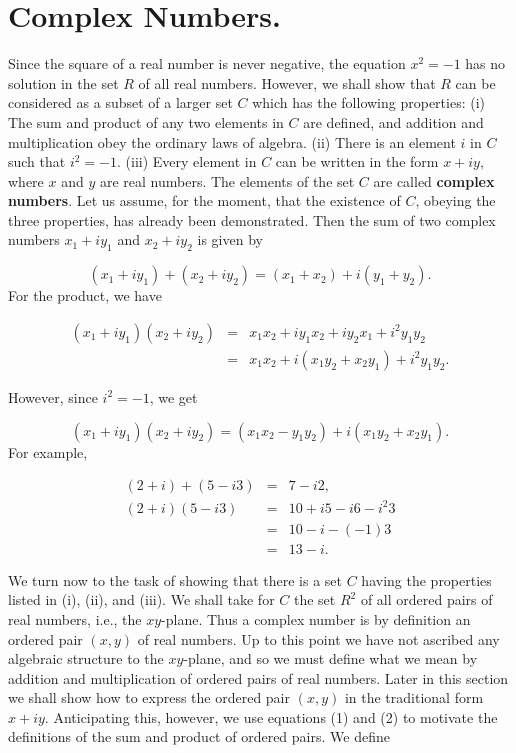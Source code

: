 \section{Complex Numbers.} 
Since the square of a real number is never negative, the equation $x^2 = -1$ has no solution in the set $R$ of all real numbers. However, we shall show that $R$ can be considered as a subset of a larger set $C$ which has the following properties: 
(i) The sum and product of any two elements in $C$ are defined, and addition and multiplication obey the ordinary laws of algebra. (ii) There is an element $i$ in $C$ such that $i^2 = - 1$. (iii) Every element in $C$ can be written in the form $x + iy$, where $x$ and $y$ are real numbers. The elements of the set $C$ are called \textbf{complex numbers}. Let us assume, for the moment, that the existence of $C$, obeying the three properties, has already been demonstrated. Then the sum of two complex numbers $x_{1} + iy_1$ and $x_{2} + iy_2$ is given by


\begin{equation}
(x_{1} + iy_{1}) + (x_{2} + iy_{2}) = (x_{1} + x_{2}) + i(y_{1} + y_{2}).  
\label{eq6.6.1}
\end{equation}
\noindent For the product, we have
 
\begin{eqnarray*}
(x_{1} + iy_{1})(x_{2} + iy_{2}) &=& x_{1}x_{2} + iy_{1}x_{2} + iy_{2}x_{1} + i^{2}y_{1}y_{2} \\
                                                &=& x_{1}x_{2} + i(x_{1}y_{2} + x_{2}y_{1}) + i^{2}y_{1}y_{2}.
\end{eqnarray*}

\noindent However, since $i^2 = -1$, we get

\begin{equation}
(x_{1} + iy_{1})(x_{2} + iy_{2}) = (x_{1}x_{2} - y_{1}y_{2}) +  i(x_{1}y_{2} + x_{2}y_{1}).  
\label{eq6.6.2}
\end{equation}
\noindent For example, 

\begin{eqnarray*}
(2 + i) + (5 - i3) &=& 7 - i2, \\
    (2 + i)(5 - i3) &=& 10 + i5 - i6 - i^{2}3 \\
                         &=& 10 - i - (-1)3\\
                         &=& 13 - i.
\end{eqnarray*}

We turn now to the task of showing that there is a set $C$ having the properties listed in (i), (ii), and (iii). We shall take for $C$ the set $R^2$ of all ordered pairs of real numbers, i.e., the $xy$-plane. Thus a complex number is by definition an ordered pair $(x, y)$ of real numbers.  Up to this point we have not ascribed any algebraic structure to the $xy$-plane, and so we must define what we mean by addition and multiplication of ordered pairs of real numbers. Later in this section we shall show how to express the ordered pair $(x, y)$ in the traditional form $x + iy$. Anticipating this, however, we use equations (1) and (2) to motivate the definitions of the sum and product of ordered pairs. We define

